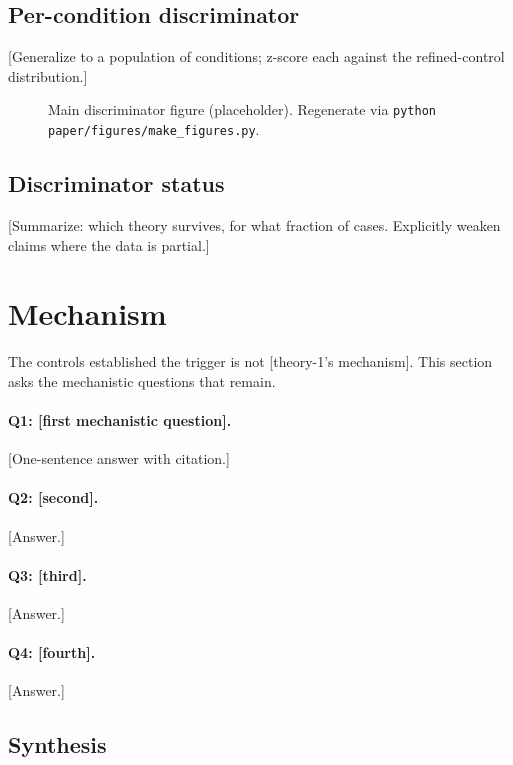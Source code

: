 \documentclass[11pt, letterpaper]{article}
\begin{document}
\subsection{Per-condition discriminator}
[Generalize to a population of conditions; z-score each against the
refined-control distribution.]

\begin{figure}[t]
\centering
\caption{Main discriminator figure (placeholder). Regenerate via
\texttt{python paper/figures/make\_figures.py}.}
\label{fig:main}
\end{figure}

\subsection{Discriminator status}
[Summarize: which theory survives, for what fraction of cases. Explicitly
weaken claims where the data is partial.]

\section{Mechanism}
\label{sec:mechanism}

The controls established the trigger is not [theory-1's mechanism]. This
section asks the mechanistic questions that remain.

\paragraph{Q1: [first mechanistic question].}
[One-sentence answer with citation.]

\paragraph{Q2: [second].}
[Answer.]

\paragraph{Q3: [third].}
[Answer.]

\paragraph{Q4: [fourth].}
[Answer.]

\subsection{Synthesis}
\label{sec:synthesis}
\end{document}
